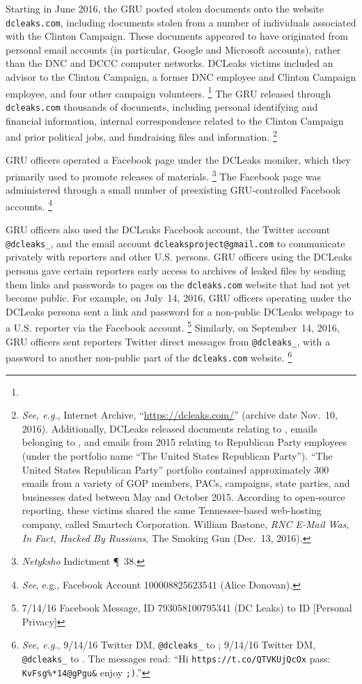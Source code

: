 Starting in June 2016, the GRU posted stolen documents onto the website \verb+dcleaks.com+, including documents stolen from a number of individuals associated with the Clinton Campaign.
These documents appeared to have originated from personal email accounts (in particular, Google and Microsoft accounts), rather than the DNC and DCCC computer networks.
DCLeaks victims included an advisor to the Clinton Campaign, a former DNC employee and Clinton Campaign employee, and four other campaign volunteers.%
\footnote{}
The GRU released through \verb+dcleaks.com+ thousands of documents, including personal identifying and financial information, internal correspondence related to the Clinton Campaign and prior political jobs, and fundraising files and information.%
\footnote{\textit{See, e.g.}, Internet Archive, ``\url{https://dcleaks.com/}'' (archive date Nov.~10, 2016).
Additionally, DCLeaks released documents relating to , emails belonging to , and emails from 2015 relating to Republican Party employees (under the portfolio name ``The United States Republican Party'').
``The United States Republican Party'' portfolio contained approximately 300 emails from a variety of GOP members, PACs, campaigns, state parties, and businesses dated between May and October 2015.
According to open-source reporting, these victims shared the same Tennessee-based web-hosting company, called Smartech Corporation.
William Bastone, \textit{RNC E-Mail Was, In Fact, Hacked By Russians}, The Smoking Gun (Dec.~13, 2016).}

GRU officers operated a Facebook page under the DCLeaks moniker, which they primarily used to promote releases of materials.%
\footnote{\textit{Netyksho} Indictment \P~38.}
The Facebook page was administered through a small number of preexisting GRU-controlled Facebook accounts.%
\footnote{\textit{See}, e.g., Facebook Account 100008825623541 (Alice Donovan).}

GRU officers also used the DCLeaks Facebook account, the Twitter account \verb+@dcleaks_+, and the email account \verb+dcleaksproject@gmail.com+ to communicate privately with reporters and other U.S. persons.
GRU officers using the DCLeaks persona gave certain reporters early access to archives of leaked files by sending them links and passwords to pages on the \verb+dcleaks.com+ website that had not yet become public.
For example, on July~14, 2016, GRU officers operating under the DCLeaks persona sent a link and password for a non-public DCLeaks webpage to a U.S. reporter via the Facebook account.%
\footnote{7/14/16 Facebook Message, ID 793058100795341 (DC Leaks) to ID [Personal Privacy]}
Similarly, on September~14, 2016, GRU officers sent reporters Twitter direct messages from \verb+@dcleaks_+, with a password to another non-public part of the \verb+dcleaks.com+ website.%
\footnote{\textit{See, e.g.}, 9/14/16 Twitter DM, \verb+@dcleaks_+ to ;
9/14/16 Twitter DM, \verb+@dcleaks_+ to .
The messages read: ``Hi \verb+https://t.co/QTVKUjQcOx+ pass: \verb+KvFsg%*14@gPgu&+ enjoy \verb+;)+.''}

